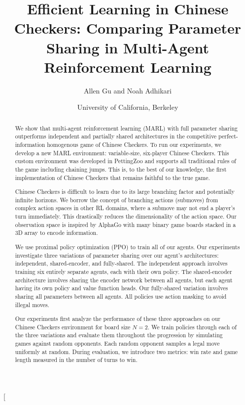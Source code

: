 \documentclass[12pt, a4paper, twocolumn]{article}
\title{Efficient Learning in Chinese Checkers: Comparing Parameter Sharing in Multi-Agent Reinforcement Learning}
\author{Allen Gu and Noah Adhikari}
\date{
    {\small University of California, Berkeley\\[2ex]} %
}
\begin{document}

\twocolumn[
  \begin{@twocolumnfalse}
    \maketitle
    
    \begin{abstract}
      We show that multi-agent reinforcement learning (MARL) with full parameter sharing outperforms independent and partially shared architectures in the competitive perfect-information homogenous game of Chinese Checkers. To run our experiments, we develop a new MARL environment: variable-size, six-player Chinese Checkers. This custom environment was developed in PettingZoo and supports all traditional rules of the game including chaining jumps. This is, to the best of our knowledge, the first implementation of Chinese Checkers that remains faithful to the true game.

      Chinese Checkers is difficult to learn due to its large branching factor and potentially infinite horizons. We borrow the concept of branching actions (submoves) from complex action spaces in other RL domains, where a submove may not end a player's turn immediately. This drastically reduces the dimensionality of the action space. Our observation space is inspired by AlphaGo with many binary game boards stacked in a 3D array to encode information.

      We use proximal policy optimization (PPO) to train all of our agents. Our experiments investigate three variations of parameter sharing over our agent's architectures: independent, shared-encoder, and fully-shared. The independent approach involves training six entirely separate agents, each with their own policy. The shared-encoder architecture involves sharing the encoder network between all agents, but each agent having its own policy and value function heads. Our fully-shared variation involves sharing all parameters between all agents. All policies use action masking to avoid illegal moves.

      Our experiments first analyze the performance of these three approaches on our Chinese Checkers environment for board size $N = 2$. We train policies through each of the three variations and evaluate them throughout the progression by simulating games against random opponents. Each random opponent samples a legal move uniformly at random. During evaluation, we introduce two metrics: win rate and game length measured in the number of turns to win.


\end{abstract}
\end{@twocolumnfalse}
\end{document}
